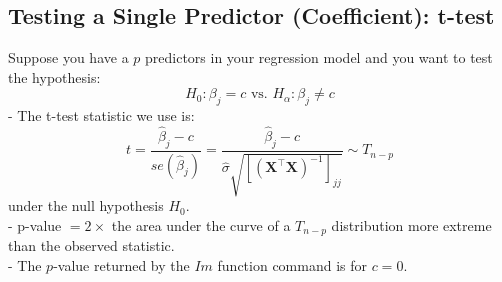 \documentclass[11pt,a4paper]{article}
\begin{document}
\subsection{Testing a Single Predictor (Coeﬃcient): t-test}
Suppose you have a $p$ predictors in your regression model and you want to test the hypothesis:
$$
H_{0}: \beta_{j}=c \text { vs. } H_{\alpha}: \beta_{j} \neq c
$$
- The t-test statistic we use is:
$$
t=\frac{\hat{\beta}_{j}-c}{s e\left(\hat{\beta}_{j}\right)}=\frac{\hat{\beta}_{j}-c}{\hat{\sigma} \sqrt{\left[\left(\mathbf{X}^{\top} \mathbf{X}\right)^{-1}\right]_{j j}}} \sim T_{n-p}
$$
under the null hypothesis $H_{0}$.\\
- p-value $=2 \times$ the area under the curve of a $T_{n-p}$ distribution more extreme than the observed statistic.\\
- The $p$-value returned by the $I m$ function command is for $c=0$.
\end{document}
